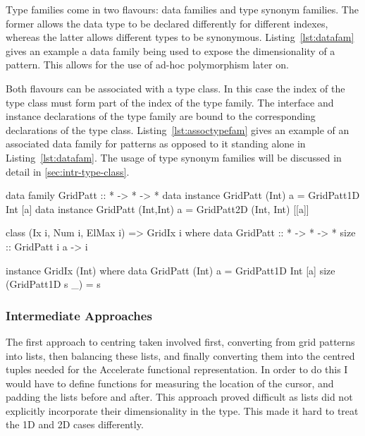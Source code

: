 \documentclass[
    12pt,
    a4paper,
    twoside,
    openright,
    ]{scrbook}
\begin{document}
Type families come in two flavours: data families and type synonym families. The
former allows the data type to be declared differently for different indexes,
whereas the latter allows different types to be synonymous.
Listing~\ref{lst:datafam} gives an example a data family being used to expose
the dimensionality of a pattern. This allows for the use of ad-hoc polymorphism
later on.

Both flavours can be associated with a type class. In this case the index of the
type class must form part of the index of the type family. The interface and
instance declarations of the type family are bound to the corresponding
declarations of the type class. Listing~\ref{lst:assoctypefam} gives an example
of an associated data family for patterns as opposed to it standing alone in
Listing~\ref{lst:datafam}. The usage of type synonym families will be discussed
in detail in \autoref{sec:intr-type-class}.

\begin{hflisting}[label=lst:datafam, caption=The data family declares two
  different constructors for 1D and 2D lists. The dimensionality of the list is
  exposed in the type.]

data family GridPatt :: * -> * -> *
data instance GridPatt (Int) a =
    GridPatt1D Int [a]
data instance GridPatt (Int,Int) a =
    GridPatt2D (Int, Int) [[a]]

\end{hflisting}

\begin{hflisting}[label=lst:assoctypefam, caption={The data family from
    listing~\ref{lst:datafam} has now been associated with the class
    \texttt{GridIx} to provide the function \texttt{size} for various
    dimensionalities. Both }]

class (Ix i, Num i, ElMax i) => GridIx i where
    data GridPatt :: * -> * -> *
    size :: GridPatt i a -> i

instance GridIx (Int) where
    data GridPatt (Int) a = GridPatt1D Int [a]
    size (GridPatt1D s _) = s

\end{hflisting}

\subsubsection{Intermediate Approaches}

The first approach to centring taken involved first, converting from grid
patterns into lists, then balancing these lists, and finally converting them
into the centred tuples needed for the Accelerate functional representation. In
order to do this I would have to define functions for measuring the location of
the cursor, and padding the lists before and after. This approach proved
difficult as lists did not explicitly incorporate their dimensionality in the
type. This made it hard to treat the 1D and 2D cases differently.
\end{document}
